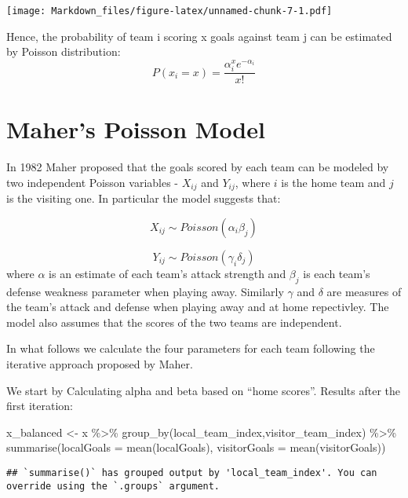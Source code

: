 \documentclass[
]{article}
\newenvironment{Shaded}{\begin{snugshade}}{\end{snugshade}}
\newcommand{\AttributeTok}[1]{\textcolor[rgb]{0.77,0.63,0.00}{#1}}
\newcommand{\FunctionTok}[1]{\textcolor[rgb]{0.00,0.00,0.00}{#1}}
\newcommand{\NormalTok}[1]{#1}
\newcommand{\OtherTok}[1]{\textcolor[rgb]{0.56,0.35,0.01}{#1}}
\newcommand{\SpecialCharTok}[1]{\textcolor[rgb]{0.00,0.00,0.00}{#1}}
\begin{document}
\texttt{[image: Markdown\_files/figure-latex/unnamed-chunk-7-1.pdf]}

Hence, the probability of team i scoring x goals against team j can be
estimated by Poisson distribution: \[
P(x_i=x) = \frac{\alpha^x_ie^{−\alpha_i}}{x!} 
\]

\hypertarget{mahers-poisson-model}{%
\section{Maher's Poisson Model}\label{mahers-poisson-model}}

In 1982 Maher proposed that the goals scored by each team can be modeled
by two independent Poisson variables - \(X_{ij}\) and \(Y_{ij}\), where
\(i\) is the home team and \(j\) is the visiting one. In particular the
model suggests that:

\[
X_{ij} \sim Poisson(\alpha_i\beta_j)
\]

\[
Y_{ij}\sim Poisson(\gamma_i\delta_j)
\] where \(\alpha\) is an estimate of each team's attack strength and
\(\beta_j\) is each team's defense weakness parameter when playing away.
Similarly \(\gamma\) and \(\delta\) are measures of the team's attack
and defense when playing away and at home repectivley. The model also
assumes that the scores of the two teams are independent.

In what follows we calculate the four parameters for each team following
the iterative approach proposed by Maher.

We start by Calculating alpha and beta based on ``home scores''. Results
after the first iteration:

\begin{Shaded}
\begin{Highlighting}[]
\NormalTok{x\_balanced }\OtherTok{\textless{}{-}}\NormalTok{ x }\SpecialCharTok{\%\textgreater{}\%}
  \FunctionTok{group\_by}\NormalTok{(local\_team\_index,visitor\_team\_index) }\SpecialCharTok{\%\textgreater{}\%}
  \FunctionTok{summarise}\NormalTok{(}\AttributeTok{localGoals =} \FunctionTok{mean}\NormalTok{(localGoals),}
        \AttributeTok{visitorGoals =} \FunctionTok{mean}\NormalTok{(visitorGoals))}
\end{Highlighting}
\end{Shaded}

\begin{verbatim}
## `summarise()` has grouped output by 'local_team_index'. You can override using the `.groups` argument.
\end{verbatim}
\end{document}
